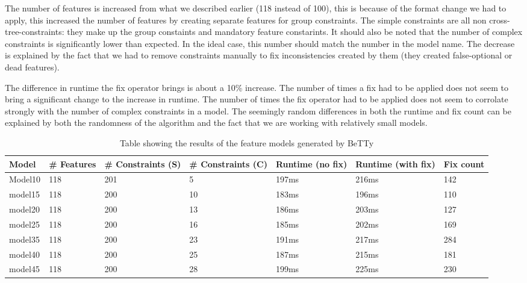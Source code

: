 The number of features is increased from what we described earlier (118 instead of 100),
this is because of the format change we had to apply, this increased the number of features
by creating separate features for group constraints. The simple constraints are all
non cross-tree-constraints: they make up the group constaints and mandatory feature
constarints. It should also be noted that the number of complex constraints is significantly
lower than expected. In the ideal case, this number should match the number in the model
name. The decrease is explained by the fact that we had to remove constraints manually
to fix inconsistencies created by them (they created false-optional or dead features).

The difference in runtime the fix operator brings is about a 10\% increase. The number
of times a fix had to be applied does not seem to bring a significant change to the
increase in runtime. The number of times the fix operator had to be applied does not
seem to corrolate strongly with the number of complex constraints in a model. The
seemingly random differences in both the runtime and fix count can be explained by both
the randomness of the algorithm and the fact that we are working with relatively small
models.

\begin{landscape}
\begin{table}[H]
    \centering
    \caption{Table showing the results of the feature models generated by BeTTy}
    \label{tab:results}
    \begin{tabular}{l|lll|ll|l}
        Model & \# Features & \# Constraints (S) & \# Constraints (C) & Runtime (no fix) & Runtime (with fix) & Fix count \\ \hline \hline
        Model10 & 118 & 201 & 5 & 197ms & 216ms & 142 \\
        model15 & 118 & 200 & 10 & 183ms & 196ms & 110 \\
        model20 & 118 & 200 & 13 & 186ms & 203ms & 127 \\
        model25 & 118 & 200 & 16 & 185ms & 202ms & 169 \\ 
        model35 & 118 & 200 & 23 & 191ms & 217ms & 284 \\
        model40 & 118 & 200 & 25 & 187ms & 215ms & 181 \\ 
        model45 & 118 & 200 & 28 & 199ms & 225ms & 230 \\
    \end{tabular}
\end{table}
\end{landscape}
